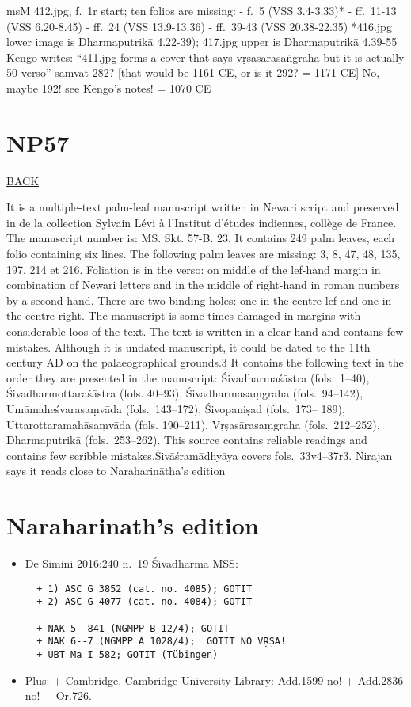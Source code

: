 \documentclass[]{article}
\begin{document}
msM 412.jpg, f.~1r start; ten folios are missing: - f.~5 (VSS 3.4-3.33)*
- ff.~11-13 (VSS 6.20-8.45) - ff.~24 (VSS 13.9-13.36) - ff.~39-43 (VSS
20.38-22.35) *416.jpg lower image is Dharmaputrikā 4.22-39); 417.jpg
upper is Dharmaputrikā 4.39-55 Kengo writes: ``411.jpg forms a cover
that says vṛṣasārasaṅgraha but it is actually 50 verso'' samvat 282?
{[}that would be 1161 CE, or is it 292? = 1171 CE{]} No, maybe 192! see
Kengo's notes! = 1070 CE

\hypertarget{np57}{%
\section{NP57}\label{np57}}

\href{Manuscripts\%20consulted}{BACK}

It is a multiple-text palm-leaf manuscript written in Newari script and
preserved in de la collection Sylvain Lévi à l'Institut d'études
indiennes, collège de France. The manuscript number is: MS. Skt. 57-B.
23. It contains 249 palm leaves, each folio containing six lines. The
following palm leaves are missing: 3, 8, 47, 48, 135, 197, 214 et 216.
Foliation is in the verso: on middle of the lef-hand margin in
combination of Newari letters and in the middle of right-hand in roman
numbers by a second hand. There are two binding holes: one in the centre
lef and one in the centre right. The manuscript is some times damaged in
margins with considerable loos of the text. The text is written in a
clear hand and contains few mistakes. Although it is undated manuscript,
it could be dated to the 11th century AD on the palaeographical
grounds.3 It contains the following text in the order they are presented
in the manuscript: Śivadharmaśāstra (fols.~1--40), Śivadharmottaraśāstra
(fols. 40--93), Śivadharmasaṃgraha (fols.~94--142), Umāmaheśvarasaṃvāda
(fols.~143--172), Śivopaniṣad (fols.~173-- 189), Uttarottaramahāsaṃvāda
(fols. 190--211), Vṛṣasārasaṃgraha (fols.~212--252), Dharmaputrikā
(fols.~253--262). This source contains reliable readings and contains
few scribble mistakes.Śivāśramādhyāya covers fols.~33v4--37r3. Nirajan
says it reads close to Naraharinātha's edition

\hypertarget{naraharinaths-edition}{%
\section{Naraharinath's edition}\label{naraharinaths-edition}}

\begin{itemize}
\item
  De Simini 2016:240 n.~19 Śivadharma MSS:

\begin{verbatim}
  + 1) ASC G 3852 (cat. no. 4085); GOTIT 
  + 2) ASC G 4077 (cat. no. 4084); GOTIT

  + NAK 5--841 (NGMPP B 12/4); GOTIT 
  + NAK 6--7 (NGMPP A 1028/4);  GOTIT NO VṚṢA! 
  + UBT Ma I 582; GOTIT (Tübingen)
\end{verbatim}
\item
  Plus: + Cambridge, Cambridge University Library: Add.1599 no! +
  Add.2836 no! + Or.726.
\end{itemize}
\end{document}
